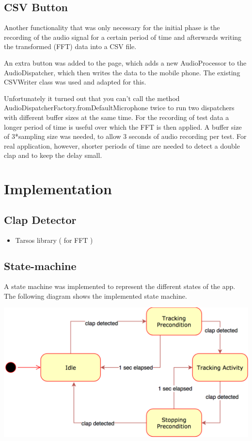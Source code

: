 \documentclass
[
 12pt, %
       DIV12,
       a4paper,
       oneside,
       titlepage,
       parskip=half,
       headings=normal,
       listof=totoc,
       bibliography=totoc,
       index=totoc,
       captions=tableheading,
       ]{scrreprt}
\begin{document}
\subsection{CSV Button}
\label{sec:orgf213c4e}
Another functionality that was only necessary for the initial phase is the
recording of the audio signal for a certain period of time and afterwards
writing the transformed (FFT) data into a CSV file.

An extra button was added to the page, which adds a new AudioProcessor to the
AudioDispatcher, which then writes the data to the mobile phone. The existing
CSVWriter class was used and adapted for this.

Unfortunately it turned out that you can't call the method
AudioDispatcherFactory.fromDefaultMicrophone twice to run two dispatchers with
different buffer sizes at the same time. For the recording of test data a longer
period of time is useful over which the FFT is then applied. A buffer size of
3*sampling size was needed, to allow 3 seconds of audio recording per test. For
real application, however, shorter periods of time are needed to detect a double
clap and to keep the delay small.



\section{Implementation}
\label{sec:org8b90d67}
\subsection{Clap Detector}
\label{sec:orgda4522d}
\begin{itemize}
\item Tarsos library ( for FFT )
\end{itemize}
\subsection{State-machine}
\label{sec:org624e913}
A state machine was implemented to represent the different states of the app.
The following diagram shows the implemented state machine.

\begin{center}
\includegraphics[width=.9\linewidth]{./imgs/statemachine.png}
\end{center}
\end{document}
